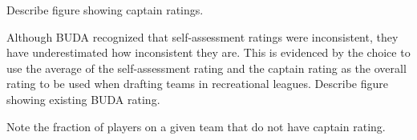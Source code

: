Describe figure showing captain ratings.

Although BUDA recognized that self-assessment ratings were inconsistent, they have underestimated how inconsistent they are. This is evidenced by the choice to use the average of the self-assessment rating and the captain rating as the overall rating to be used when drafting teams in recreational leagues.  Describe figure showing existing BUDA rating.

Note the fraction of players on a given team that do not have captain rating.
